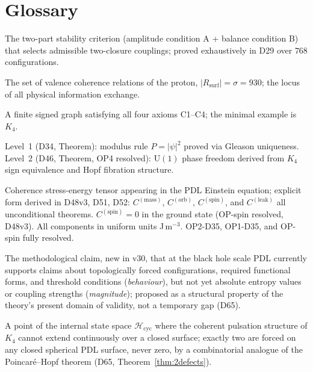 \documentclass[11pt,a4paper]{article}
\theoremstyle{plain}
\theoremstyle{definition}
\theoremstyle{remark}
\newcommand{\Kfour}{K_4}
\newcommand{\Rsurf}{R_{\mathrm{surf}}}
\newcommand{\Ccoh}{C_{\mathrm{coh}}}
\begin{document}
\section{Glossary}
\label{sec:glossary}

\begin{description}[leftmargin=3.5cm, style=nextline]
\item[AB criterion] The two-part stability criterion (amplitude condition A + balance condition B) that selects admissible two-closure couplings; proved exhaustively in D29 over $768$ configurations.
\item[Active surface $\Rsurf$] The set of valence coherence relations of the proton, $|\Rsurf|=\sigma=930$; the locus of all physical information exchange.
\item[Admissible closure] A finite signed graph satisfying all four axioms C1--C4; the minimal example is $K_4$.
\item[Born Level~1 / Level~2] Level~1 (D34, Theorem): modulus rule $P=|\psi|^2$ proved via Gleason uniqueness. Level~2 (D46, Theorem, OP4 resolved): $\mathrm{U}(1)$ phase freedom derived from $K_4$ sign equivalence and Hopf fibration structure.
\item[$\Ccoh$] Coherence stress-energy tensor appearing in the PDL Einstein equation; explicit form derived in D48v3, D51, D52: $C^{(\mathrm{mass})}$, $C^{(\mathrm{orb})}$, $C^{(\mathrm{spin})}$, and $C^{(\mathrm{leak})}$ all unconditional theorems. $C^{(\mathrm{spin})}=0$ in the ground state (OP-spin resolved, D48v3). All components in uniform units J\,m$^{-3}$. OP2-D35, OP1-D35, and OP-spin fully resolved. 
\item[Behaviour-versus-magnitude principle] The methodological claim, new in v30, that at the black hole scale PDL currently supports claims about topologically forced configurations, required functional forms, and threshold conditions (\emph{behaviour}), but not yet absolute entropy values or coupling strengths (\emph{magnitude}); proposed as a structural property of the theory's present domain of validity, not a temporary gap (D65).
\item[Coherence defect] A point of the internal state space $\mathcal{H}_{\mathrm{cyc}}$ where the coherent pulsation structure of $\Kfour$ cannot extend continuously over a closed surface; exactly two are forced on any closed spherical PDL surface, never zero, by a combinatorial analogue of the Poincar\'e--Hopf theorem (D65, Theorem~\ref{thm:2defects}).

\end{description}
\end{document}
